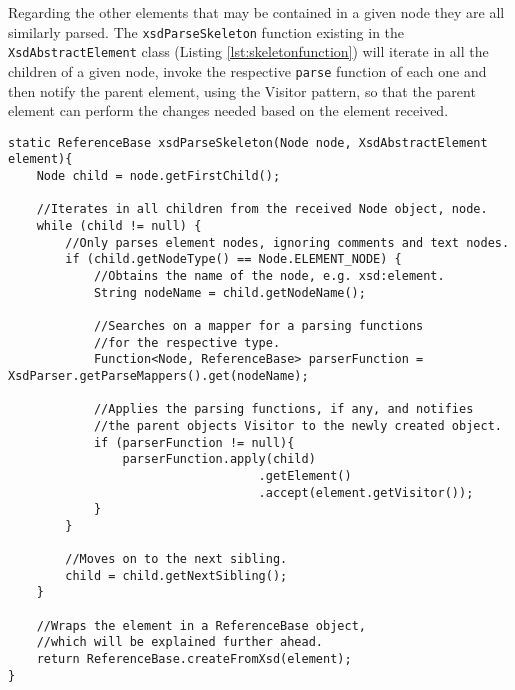 \noindent
Regarding the other elements that may be contained in a given node they are all similarly parsed. The \texttt{xsdParseSkeleton} function existing in the \texttt{XsdAbstractElement} class (Listing \ref{lst:skeletonfunction}) will iterate in all the children of a given node, invoke the respective \texttt{parse} function of each one and then notify the parent element, using the Visitor pattern, so that the parent element can perform the changes needed based on the element received.

\bigskip

\begin{minipage}{\linewidth}
\begin{lstlisting}[caption={XsdParseSkeleton Parsing Children From a Node},captionpos=b,label={lst:skeletonfunction}]
static ReferenceBase xsdParseSkeleton(Node node, XsdAbstractElement element){
    Node child = node.getFirstChild();

    //Iterates in all children from the received Node object, node.
    while (child != null) {   
        //Only parses element nodes, ignoring comments and text nodes.
        if (child.getNodeType() == Node.ELEMENT_NODE) { 
            //Obtains the name of the node, e.g. xsd:element.
            String nodeName = child.getNodeName();

            //Searches on a mapper for a parsing functions 
            //for the respective type.
            Function<Node, ReferenceBase> parserFunction = XsdParser.getParseMappers().get(nodeName);

            //Applies the parsing functions, if any, and notifies 
            //the parent objects Visitor to the newly created object.
            if (parserFunction != null){
                parserFunction.apply(child)
                                   .getElement()
                                   .accept(element.getVisitor());
            }
        }

        //Moves on to the next sibling.
        child = child.getNextSibling();
    }

    //Wraps the element in a ReferenceBase object, 
    //which will be explained further ahead.
    return ReferenceBase.createFromXsd(element);
}
\end{lstlisting}
\end{minipage}

